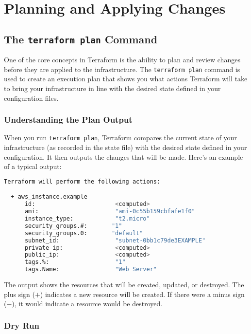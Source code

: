 \chapter{Planning and Applying Changes}
\sloppy

\section{The \texttt{terraform plan} Command}

One of the core concepts in Terraform is the ability to plan and review changes before they are applied to the infrastructure. The \texttt{terraform plan} command is used to create an execution plan that shows you what actions Terraform will take to bring your infrastructure in line with the desired state defined in your configuration files.

\subsection{Understanding the Plan Output}

When you run \texttt{terraform plan}, Terraform compares the current state of your infrastructure (as recorded in the state file) with the desired state defined in your configuration. It then outputs the changes that will be made. Here's an example of a typical output:

\begin{lstlisting}[language=bash]
Terraform will perform the following actions:

  + aws_instance.example
      id:                       <computed>
      ami:                      "ami-0c55b159cbfafe1f0"
      instance_type:            "t2.micro"
      security_groups.#:       "1"
      security_groups.0:       "default"
      subnet_id:                "subnet-0bb1c79de3EXAMPLE"
      private_ip:               <computed>
      public_ip:                <computed>
      tags.%:                   "1"
      tags.Name:                "Web Server"
\end{lstlisting}

The output shows the resources that will be created, updated, or destroyed. The plus sign (\(+\)) indicates a new resource will be created. If there were a minus sign (\(-\)), it would indicate a resource would be destroyed.

\subsection{Dry Run}

